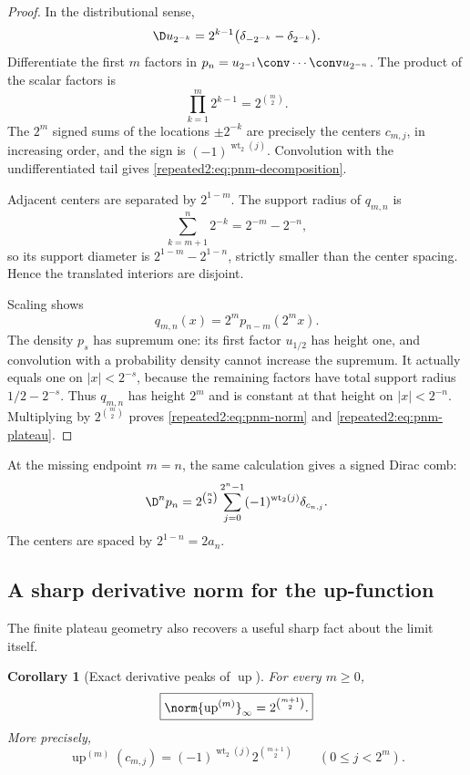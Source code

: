\documentclass[11pt,oneside]{article}
\newtheorem{corollary}[corollary]{Corollary}
\theoremstyle{definition}
\theoremstyle{remark}
\newcommand{\Up}{\operatorname{up}}
\newcommand{\wt}{\operatorname{wt}_2}
\begin{document}
\begin{proof}
In the distributional sense,
\begin{equation}
 \D u_{2^{-k}}=2^{k-1}\bigl(\delta_{-2^{-k}}-\delta_{2^{-k}}\bigr).
 \label{repeated2:eq:uniform-derivative-delta}
\end{equation}
Differentiate the first $m$ factors in
$p_n=u_{2^{-1}}\conv\cdots\conv u_{2^{-n}}$.  The product of the scalar factors is
\[
 \prod_{k=1}^{m}2^{k-1}=2^{\binom m2}.
\]
The $2^m$ signed sums of the locations $\pm2^{-k}$ are precisely the centers
$c_{m,j}$, in increasing order, and the sign is $(-1)^{\wt(j)}$.  Convolution with the
undifferentiated tail gives \eqref{repeated2:eq:pnm-decomposition}.

Adjacent centers are separated by $2^{1-m}$.  The support radius of $q_{m,n}$ is
\[
 \sum_{k=m+1}^{n}2^{-k}=2^{-m}-2^{-n},
\]
so its support diameter is $2^{1-m}-2^{1-n}$, strictly smaller than the center spacing.
Hence the translated interiors are disjoint.

Scaling shows
\begin{equation}
 q_{m,n}(x)=2^m p_{n-m}(2^mx).
 \label{repeated2:eq:qmn-scaling}
\end{equation}
The density $p_s$ has supremum one: its first factor $u_{1/2}$ has height one, and
convolution with a probability density cannot increase the supremum.  It actually equals
one on $|x|<2^{-s}$, because the remaining factors have total support radius
$1/2-2^{-s}$.  Thus $q_{m,n}$ has height $2^m$ and is constant at that height on
$|x|<2^{-n}$.  Multiplying by $2^{\binom m2}$ proves
\eqref{repeated2:eq:pnm-norm} and \eqref{repeated2:eq:pnm-plateau}.
\end{proof}

At the missing endpoint $m=n$, the same calculation gives a signed Dirac comb:
\begin{equation}
 \D^np_n=2^{\binom n2}
 \sum_{j=0}^{2^n-1}(-1)^{\wt(j)}\delta_{c_{n,j}}.
 \label{repeated2:eq:pn-top-delta-comb}
\end{equation}
The centers are spaced by $2^{1-n}=2a_n$.

\subsection{A sharp derivative norm for the up-function}

The finite plateau geometry also recovers a useful sharp fact about the limit itself.

\begin{corollary}[Exact derivative peaks of $\Up$]
\label{repeated2:cor:up-derivative-norm}
For every $m\ge0$,
\begin{equation}
 \boxed{\displaystyle
 \norm{\Up^{(m)}}_\infty=2^{\binom{m+1}{2}}.}
 \label{repeated2:eq:up-derivative-norm}
\end{equation}
More precisely,
\begin{equation}
 \Up^{(m)}(c_{m,j})=(-1)^{\wt(j)}2^{\binom{m+1}{2}}
 \qquad(0\le j<2^m).
 \label{repeated2:eq:up-derivative-peaks}
\end{equation}
\end{corollary}
\end{document}
